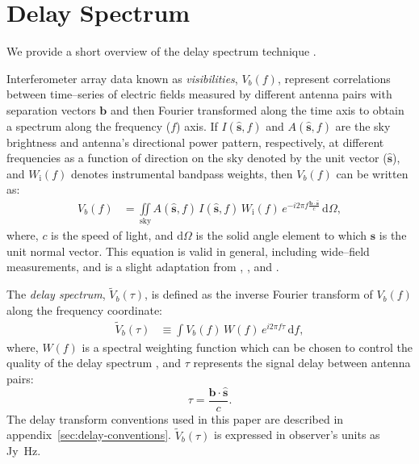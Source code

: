 \documentclass[preprint2,iop,numberedappendix,twocolappendix,appendixfloats]{emulateapj}
\newcommand{\dif}{\mathrm{d}}
\begin{document}
\section{Delay Spectrum}\label{sec:delay-spectrum}

We provide a short overview of the delay spectrum technique \citep{par12a,par12b}. 

Interferometer array data known as {\it visibilities}, $V_b(f)$, represent correlations between time--series of electric fields measured by different antenna pairs with separation vectors $\boldsymbol{b}$ and then Fourier transformed along the time axis to obtain a spectrum along the frequency ($f$) axis. If $I(\hat{\boldsymbol{s}},f)$ and $A(\hat{\boldsymbol{s}},f)$ are the sky brightness and antenna's directional power pattern, respectively, at different frequencies as a function of direction on the sky denoted by the unit vector ($\hat{\boldsymbol{s}}$), and $W_\textrm{i}(f)$ denotes instrumental bandpass weights, then $V_b(f)$ can be written as:
\begin{align}\label{eqn:obsvis}
  V_b(f) &= \iint\limits_\textrm{sky} A(\hat{\boldsymbol{s}},f)\,I(\hat{\boldsymbol{s}},f)\,W_\textrm{i}(f)\,e^{-i2\pi f\frac{\boldsymbol{b}\cdot\hat{\boldsymbol{s}}}{c}}\,\dif\Omega,
\end{align}
where, $c$ is the speed of light, and $\dif\Omega$ is the solid angle element to which $\hat{\boldsymbol{s}}$ is the unit normal vector. This equation is valid in general, including wide--field measurements, and is a slight adaptation from \citet{van34}, \citet{zer38}, and \citet{tho01}.

The {\it delay spectrum}, $\tilde{V}_b(\tau)$, is defined as the inverse Fourier transform of $V_b(f)$ along the frequency coordinate:
\begin{align}\label{eqn:delay-transform}
  \tilde{V}_b(\tau) &\equiv \int V_b(f)\,W(f)\,e^{i2\pi f\tau}\,\dif f,
\end{align}
where, $W(f)$ is a spectral weighting function which can be chosen to control the quality of the delay spectrum \citep{thy13,ved12}, and $\tau$ represents the signal delay between antenna pairs:
\begin{equation}\label{eqn:delay}
  \tau = \frac{\boldsymbol{b}\cdot\hat{\boldsymbol{s}}}{c}.
\end{equation}
The delay transform conventions used in this paper are described in appendix~\ref{sec:delay-conventions}. $\tilde{V}_b(\tau)$ is expressed in observer's units as Jy~Hz. 
\end{document}
